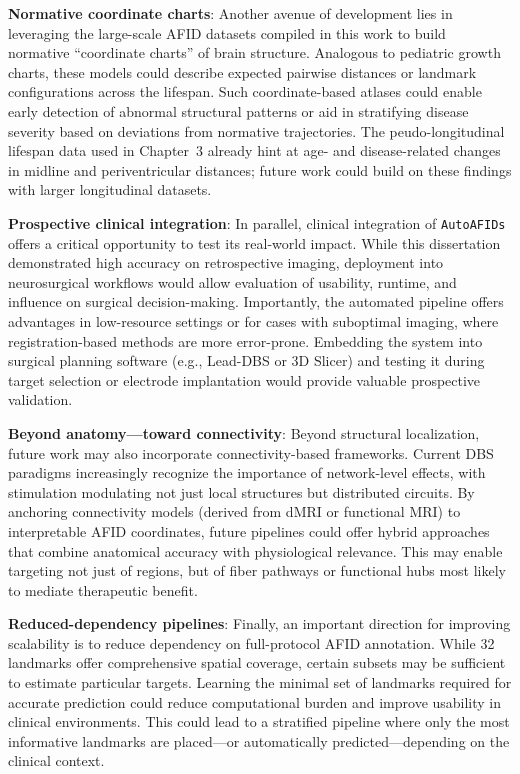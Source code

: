 \textbf{Normative coordinate charts}: Another avenue of development lies in leveraging the large-scale AFID datasets compiled in this work to build normative “coordinate charts” of brain structure. Analogous to pediatric growth charts, these models could describe expected pairwise distances or landmark configurations across the lifespan. Such coordinate-based atlases could enable early detection of abnormal structural patterns or aid in stratifying disease severity based on deviations from normative trajectories. The peudo-longitudinal lifespan data used in Chapter~3 already hint at age- and disease-related changes in midline and periventricular distances; future work could build on these findings with larger longitudinal datasets.

\textbf{Prospective clinical integration}: In parallel, clinical integration of \texttt{AutoAFIDs} offers a critical opportunity to test its real-world impact. While this dissertation demonstrated high accuracy on retrospective imaging, deployment into neurosurgical workflows would allow evaluation of usability, runtime, and influence on surgical decision-making. Importantly, the automated pipeline offers advantages in low-resource settings or for cases with suboptimal imaging, where registration-based methods are more error-prone. Embedding the system into surgical planning software (e.g., Lead-DBS or 3D Slicer) and testing it during target selection or electrode implantation would provide valuable prospective validation. 

\textbf{Beyond anatomy—toward connectivity}: Beyond structural localization, future work may also incorporate connectivity-based frameworks. Current DBS paradigms increasingly recognize the importance of network-level effects, with stimulation modulating not just local structures but distributed circuits. By anchoring connectivity models (derived from dMRI or functional MRI) to interpretable AFID coordinates, future pipelines could offer hybrid approaches that combine anatomical accuracy with physiological relevance. This may enable targeting not just of regions, but of fiber pathways or functional hubs most likely to mediate therapeutic benefit.

\textbf{Reduced-dependency pipelines}: Finally, an important direction for improving scalability is to reduce dependency on full-protocol AFID annotation. While 32 landmarks offer comprehensive spatial coverage, certain subsets may be sufficient to estimate particular targets. Learning the minimal set of landmarks required for accurate prediction could reduce computational burden and improve usability in clinical environments. This could lead to a stratified pipeline where only the most informative landmarks are placed—or automatically predicted—depending on the clinical context.


